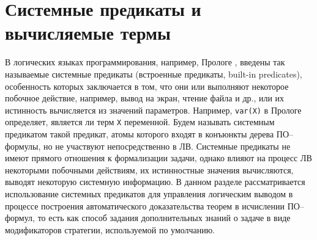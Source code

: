 \section{Системные предикаты и вычисляемые термы}
В логических языках программирования, например, Прологе \cite{Bratko}, введены так называемые системные предикаты (встроенные предикаты, built-in predicates), особенность которых заключается в том, что они или выполняют некоторое побочное действие, например, вывод на экран, чтение файла и др., или их истинность вычисляется из значений параметров. Например, \texttt{var(X)} в Прологе определяет, является ли терм \texttt{X} переменной. Будем называть системным предикатом такой предикат, атомы которого входят в конъюнкты дерева ПО--формулы, но не участвуют непосредственно в ЛВ. Системные предикаты не имеют прямого отношения к формализации задачи, однако влияют на процесс ЛВ некоторыми побочными действиям, их истинностные значения вычисляются, выводят некоторую системную информацию. В данном разделе рассматривается использование системных предикатов для управления логическим выводом в процессе построения автоматического доказательства теорем в исчислении ПО--формул, то есть как способ задания дополнительных знаний о задаче в виде модификаторов стратегии, используемой по умолчанию.

